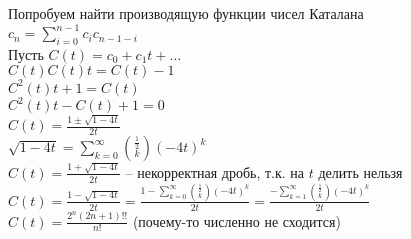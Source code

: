 \documentclass[12pt]{article}
\begin{document}
Попробуем найти производящую функции чисел Каталана\\
$c_n = \sum_{i=0}^{n-1} c_ic_{n-1-i}$\\
Пусть $C(t) = c_0 + c_1t + \ldots$\\
$C(t)C(t)t = C(t)-1$\\
$C^2(t)t + 1 = C(t)$\\
$C^2(t)t - C(t) + 1 = 0$\\
$C(t) = \frac{1\pm\sqrt{1-4t}}{2t}$\\
$\sqrt{1-4t} = \sum_{k=0}^\infty \binom{\frac12}{k}(-4t)^k$\\
$C(t) = \frac{1+\sqrt{1-4t}}{2t}$ -- некорректная дробь, т.к. на $t$ делить нельзя\\
$C(t) = \frac{1-\sqrt{1-4t}}{2t} = \frac{1-\sum_{k=0}^\infty \binom{\frac12}{k}(-4t)^k}{2t} = \frac{-\sum_{k=1}^\infty \binom{\frac12}{k}(-4t)^k}{2t}$\\
$C(t) = \frac{2^n(2n+1)!!}{n!}$ (почему-то численно не сходится)
\end{document}

